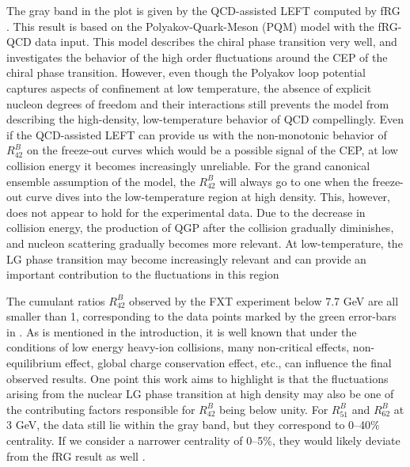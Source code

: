 \documentclass[aps,twocolumn,prd,superscriptaddress,nofootinbib,floatfix]{revtex4-2}
\def\Fig#1{\Cref{#1}}
\begin{document}
The gray band in the plot is given by the QCD-assisted LEFT computed by fRG \cite{Fu:2023lcm}. This result is based on the Polyakov-Quark-Meson (PQM) model with the fRG-QCD data input. This model describes the chiral phase transition very well, and investigates the behavior of the high order fluctuations around the CEP of the chiral phase transition. However, even though the Polyakov loop potential captures aspects of confinement at low temperature, the absence of explicit nucleon degrees of freedom and their interactions still prevents the model from describing the high-density, low-temperature behavior of QCD compellingly. Even if the QCD-assisted LEFT can provide us with the non-monotonic behavior of $R^B_{42}$ on the freeze-out curves which would be a possible signal of the CEP, at low collision energy it becomes increasingly unreliable. For the grand canonical ensemble assumption of the model, the $R^B_{42}$ will always go to one when the freeze-out curve dives into the low-temperature region at high density. This, however, does not appear to hold for the experimental data. Due to the decrease in collision energy, the production of QGP after the collision gradually diminishes, and nucleon scattering gradually becomes more relevant. At low-temperature, the LG phase transition may become increasingly relevant and can provide an important contribution to the fluctuations in this region

The cumulant ratios $R^B_{42}$ observed by the FXT experiment below 7.7 GeV \cite{Sweger:2025,STAR:2021fge,HADES:2020wpc} are all smaller than 1, corresponding to the data points marked by the green error-bars in \Fig{fig:sqrts_all}. As is mentioned in the introduction, it is well known that under the conditions of low energy heavy-ion collisions, many non-critical effects, non-equilibrium effect, global charge conservation effect, etc., can influence the final observed results. One point this work aims to highlight is that the fluctuations arising from the nuclear LG phase transition at high density may also be one of the contributing factors responsible for $R^B_{42}$ being below unity. For $R^B_{51}$ and $R^B_{62}$ at 3 GeV, the data still lie within the gray band, but they correspond to 0–40$\%$ centrality. If we consider a narrower centrality of 0–5$\%$, they would likely deviate from the fRG result as well \cite{Xu:2026qvi}.
\end{document}
